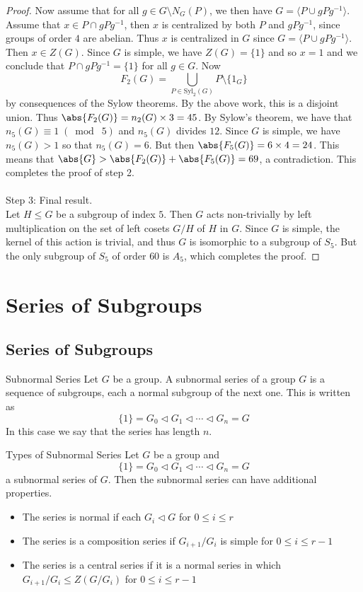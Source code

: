 \documentclass[a4paper]{article}
\begin{document}
\begin{thm}{}{}
\begin{proof}
Now assume that for all $g\in G\setminus N_G(P)$, we then have $G=\langle P\cup gPg^{-1}\rangle$. Assume that $x\in P\cap gPg^{-1}$, then $x$ is centralized by both $P$ and $gPg^{-1}$, since groups of order $4$ are abelian. Thus $x$ is centralized in $G$ since $G=\langle P\cup gPg^{-1}\rangle$. Then $x\in Z(G)$. Since $G$ is simple, we have $Z(G)=\{1\}$ and so $x=1$ and we conclude that $P\cap gPg^{-1}=\{1\}$ for all $g\in G$. Now $$F_2(G)=\bigcup_{P\in\text{Syl}_2(G)}P\setminus\{1_G\}$$ by consequences of the Sylow theorems. By the above work, this is a disjoint union. Thus $\abs{F_2(G)}=n_2(G)\times 3=45$. By Sylow's theorem, we have that $n_5(G)\equiv 1\;(\bmod\;5)$ and $n_5(G)$ divides $12$. Since $G$ is simple, we have $n_5(G)>1$ so that $n_5(G)=6$. But then $\abs{F_5(G)}=6\times 4=24$. This means that $\abs{G}>\abs{F_2(G)}+\abs{F_5(G)}=69$, a contradiction. This completes the proof of step 2. \\~\\

Step 3: Final result. \\
Let $H\leq G$ be a subgroup of index $5$. Then $G$ acts non-trivially by left multiplication on the set of left cosets $G/H$ of $H$ in $G$. Since $G$ is simple, the kernel of this action is trivial, and thus $G$ is isomorphic to a subgroup of $S_5$. But the only subgroup of $S_5$ of order $60$ is $A_5$, which completes the proof. 
\end{proof}
\end{thm}


\pagebreak
\section{Series of Subgroups}
\subsection{Series of Subgroups}
\begin{defn}{Subnormal Series}{} Let $G$ be a group. A subnormal series  of a group $G$ is a sequence of subgroups, each a normal subgroup of the next one. This is written as $$\{1\}=G_0\triangleleft G_1\triangleleft\cdots\triangleleft G_n=G$$ In this case we say that the series has length $n$. 
\end{defn}

\begin{defn}{Types of Subnormal Series}{} Let $G$ be a group and $$\{1\}=G_0\triangleleft G_1\triangleleft\cdots\triangleleft G_n=G$$ a subnormal series of $G$. Then the subnormal series can have additional properties. 
\begin{itemize}
\item The series is normal if each $G_i\triangleleft G$ for $0\leq i\leq r$
\item The series is a composition series if $G_{i+1}/G_i$ is simple for  $0\leq i\leq r-1$
\item The series is a central series if it is a normal series in which $G_{i+1}/G_i\leq Z(G/G_i)$ for  $0\leq i\leq r-1$
\end{itemize}
\end{defn}
\end{document}
